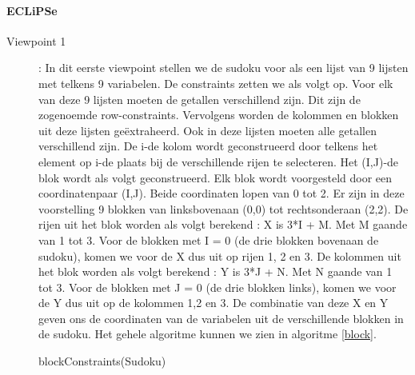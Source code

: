 \paragraph{ECLiPSe}
\begin{description}
 \item[Viewpoint 1]:
In dit eerste viewpoint stellen we de sudoku voor als een lijst van 9 lijsten met telkens 9 variabelen.
De constraints zetten we als volgt op. Voor elk van deze 9 lijsten moeten de getallen verschillend zijn.
Dit zijn de zogenoemde row-constraints. Vervolgens worden de kolommen en blokken uit deze lijsten ge\"extraheerd.
Ook in deze lijsten moeten alle getallen verschillend zijn. De i-de kolom wordt geconstrueerd door telkens 
het element op i-de plaats bij de verschillende rijen te selecteren. Het (I,J)-de blok wordt als volgt
geconstrueerd. Elk blok wordt voorgesteld door een coordinatenpaar (I,J). Beide coordinaten lopen
van 0 tot 2. Er zijn in deze voorstelling 9 blokken van linksbovenaan (0,0) tot
rechtsonderaan (2,2). De rijen uit het blok worden als volgt berekend : X is 3*I + M. Met M gaande
van 1 tot 3. Voor de blokken met I = 0 (de drie blokken bovenaan de sudoku), komen we voor de X 
dus uit op rijen 1, 2 en 3. De kolommen uit het blok worden als volgt berekend : Y is 3*J + N. Met N gaande
van 1 tot 3. Voor de blokken met J = 0 (de drie blokken links), komen we voor de Y dus uit op de kolommen
1,2 en 3. De combinatie van deze X en Y geven ons de coordinaten van de variabelen uit de verschillende
blokken in de sudoku. Het gehele algoritme kunnen we zien in algoritme \ref{block}.
\begin{algorithm}
\caption{blockConstraints(Sudoku)}
\label{block}
\begin{verbatim}


\end{verbatim}
\end{algorithm}
\end{description}
